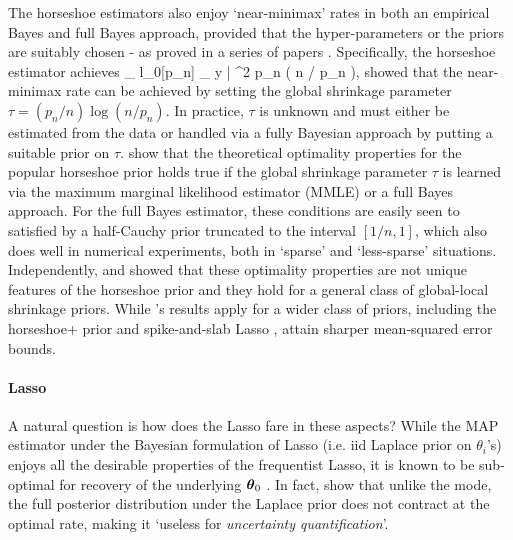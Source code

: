 \documentclass[11pt]{article}
\numberwithin{equation}{section}
\begin{document}
The horseshoe estimators also enjoy `near-minimax' rates in both an empirical Bayes and full Bayes approach, provided that the hyper-parameters or the priors are suitably chosen - as proved in a series of papers \citep{van2014horseshoe,van2015conditions,van2016many,van2017adaptive}. Specifically, the horseshoe estimator achieves
\beq
\sup_{ \theta \in l_0[p_n] } \; _{ y | \theta } ^2 \asymp p_n \log \left ( n / p_n \right ), \label{eq:minimax}
\eeq
\citet{van2014horseshoe} showed that the near-minimax rate can be achieved by setting the global shrinkage parameter $\tau = (p_n/n) \log(n/p_n)$. In practice, $\tau$ is unknown and must either be estimated from the data or handled via a fully Bayesian approach by putting a suitable prior on $\tau$.  \cite{van2017adaptive} show that the theoretical optimality properties for the popular horseshoe prior holds true if the global shrinkage parameter $\tau$ is learned via the maximum marginal likelihood estimator (MMLE) or a full Bayes approach. For the full Bayes estimator, these conditions are easily seen to satisfied by a half-Cauchy prior truncated to the interval $[1/n,1]$, which also does well in numerical experiments, both in `sparse' and `less-sparse' situations. Independently, \citet{van2015conditions} and \citet{ghosh2016asymptotic} showed that these optimality properties are not unique features of the horseshoe prior and they hold for a general class of global-local shrinkage priors. While \cite{van2015conditions}'s results apply for a wider class of priors, including the horseshoe+ prior \citep{bhadra2015horseshoe+} and spike-and-slab Lasso \citep{rovckova2016spike}, \citet{ghosh2016asymptotic} attain sharper mean-squared error bounds. 

\paragraph{Lasso}

A natural question is how does the Lasso fare in these aspects? While the MAP estimator under the Bayesian formulation of Lasso (i.e. iid Laplace prior on $\theta_i$'s) enjoys all the desirable properties of the frequentist Lasso, it is known to be sub-optimal for recovery of the underlying $\boldsymbol{\theta}_0$ \citep{castillo2012needles}. In fact, \cite{castillo2012needles} show that unlike the mode, the full posterior distribution under the Laplace prior does not contract at the optimal rate, making it `useless for \textit{uncertainty quantification}'. 
\end{document}
